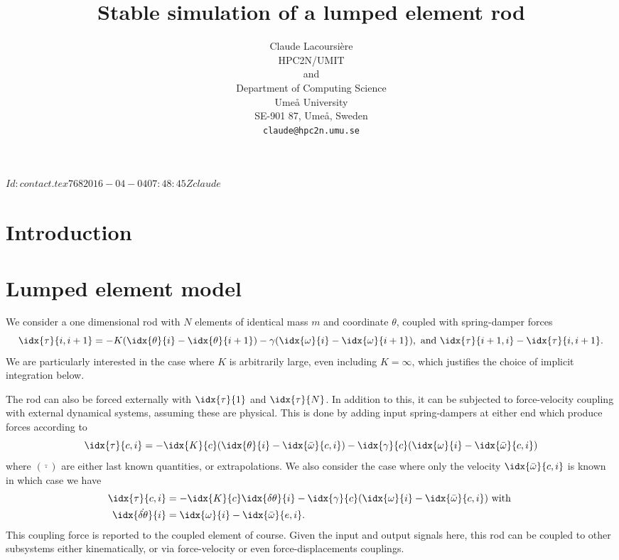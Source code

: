 \documentclass[10pt,notitlepage,abstracton]{scrartcl}
\title{Stable simulation of a lumped element rod}
\author{Claude Lacoursi{\`{e}}re \\
  HPC2N/UMIT \\
  and \\
  Department of Computing Science \\
  Ume{\aa} University\\
  SE-901 87, Ume{\aa}, Sweden\\
  \texttt{claude@hpc2n.umu.se}
}
\theoremstyle{plain}
\theoremstyle{plain}
\theoremstyle{plain}
\begin{document}
\svnInfo $Id: contact.tex 768 2016-04-04 07:48:45Z claude $
\maketitle{}
\svnId
\begin{abstract}

\end{abstract}

\section{Introduction}
\label{sec:introduction}



\section{Lumped element model}
\label{sec:optim-cont-point}

We consider a one dimensional rod with $N$ elements of identical mass $m$
and coordinate $\theta$, coupled with spring-damper forces
\begin{equation}
  \label{eq:1}
  \idx{\tau}{i,i+1} = -K(\idx{\theta}{i}-\idx{\theta}{i+1}) -
  \gamma(\idx{\omega}{i}-\idx{\omega}{i+1}), \text{ and } \idx{\tau}{i+1,i} -
  \idx{\tau}{i,i+1}. 
\end{equation}
We are particularly interested in the case where $K$ is arbitrarily large,
even including $K=\infty$, which justifies the choice of implicit
integration below.

The rod can also be forced externally with $\idx{\tau}{1}$ and $\idx{\tau}{N}$.
In addition to this, it can be subjected to force-velocity coupling with
external dynamical systems, assuming these are physical.  This is done by
adding input spring-dampers at either end which produce forces according to 
\begin{equation}
  \label{eq:2}
  \idx{\tau}{c,i} = 
-\idx{K}{c}(\idx{\theta}{i}- \idx{\bar{\omega}}{c,i})
-\idx{\gamma}{c}(\idx{\omega}{i}- \idx{\bar{\omega}}{c,i})
\end{equation}
where $(\bar{\cdot})$ are either last known quantities, or extrapolations.
We also consider the case where only the velocity $\idx{\bar{\omega}}{c,i}$
is known in which case we have
\begin{equation}
  \label{eq:3}
  \begin{split}
    \idx{\tau}{c,i} &= 
    -\idx{K}{c}\idx{\delta\theta}{i}
    -\idx{\gamma}{c}(\idx{\omega}{i}- \idx{\bar{\omega}}{c,i})\text{ with } \\
    \idx{\dot{\delta\theta}}{i} & =
    \idx{\omega}{i}-\idx{\bar{\omega}}{e,i}. 
  \end{split}
\end{equation}
This coupling force is reported to the coupled element of course.  Given
the input and output signals here, this rod can be coupled to
other subsystems either kinematically, or via force-velocity or even
force-displacements couplings.
\end{document}
